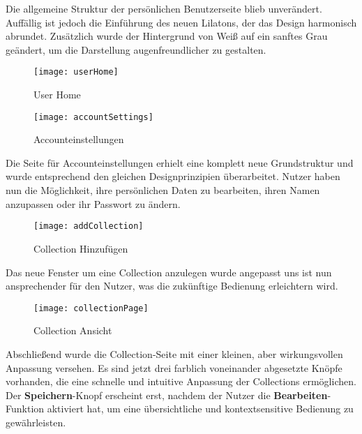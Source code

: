 Die allgemeine Struktur der persönlichen Benutzerseite blieb unverändert.
Auffällig ist jedoch die Einführung des neuen Lilatons, der das Design harmonisch abrundet.
Zusätzlich wurde der Hintergrund von Weiß auf ein sanftes Grau geändert, um die Darstellung augenfreundlicher zu gestalten.

\begin{figure}[h]
    \centering
    \texttt{[image: userHome]}
    \caption{User Home}
    \label{fig:userHome}
\end{figure}

\pagebreak

\begin{figure}[h]
    \centering
    \texttt{[image: accountSettings]}
    \caption{Accounteinstellungen}
    \label{fig:accountSettings}
\end{figure}

Die Seite für Accounteinstellungen erhielt eine komplett neue Grundstruktur und wurde entsprechend den gleichen Designprinzipien überarbeitet.
Nutzer haben nun die Möglichkeit, ihre persönlichen Daten zu bearbeiten, ihren Namen anzupassen oder ihr Passwort zu ändern.

\begin{figure}[h]
    \centering
    \texttt{[image: addCollection]}
    \caption{Collection Hinzufügen}
    \label{fig:addCollection}
\end{figure}

Das neue Fenster um eine Collection anzulegen wurde angepasst uns ist nun ansprechender für den Nutzer, was die zukünftige Bedienung erleichtern wird.
\pagebreak

\begin{figure}[h]
    \centering
    \texttt{[image: collectionPage]}
    \caption{Collection Ansicht}
    \label{fig:collectionPage}
\end{figure}

Abschließend wurde die Collection-Seite mit einer kleinen, aber wirkungsvollen Anpassung versehen.
Es sind jetzt drei farblich voneinander abgesetzte Knöpfe vorhanden, die eine schnelle und intuitive Anpassung der Collections ermöglichen.
Der \textbf{Speichern}-Knopf erscheint erst, nachdem der Nutzer die \textbf{Bearbeiten}-Funktion aktiviert hat, um eine übersichtliche und kontextsensitive Bedienung zu gewährleisten.
